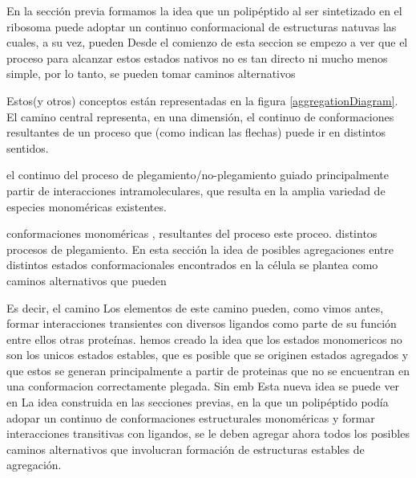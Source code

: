 % 



En la sección previa formamos la idea que un polipéptido al ser sintetizado en el ribosoma puede adoptar un continuo conformacional de estructuras natuvas las cuales, a su vez, pueden 
Desde el comienzo de esta seccion se empezo a ver que el proceso para alcanzar estos estados nativos no es tan directo ni mucho menos simple, por lo tanto, se pueden tomar caminos alternativos 

Estos(y otros) conceptos están representadas en la figura \ref{aggregationDiagram}.
El camino central representa, en una dimensión, el continuo de conformaciones resultantes de un proceso que (como indican las flechas) puede ir en distintos sentidos.

el continuo del proceso de plegamiento/no-plegamiento guiado principalmente partir de interacciones intramoleculares, que resulta en la amplia variedad de especies monoméricas existentes.


conformaciones monoméricas 
, resultantes del proceso  este proceo. 
distintos procesos de plegamiento. 
En esta sección    la idea de posibles agregaciones entre distintos estados conformacionales encontrados en la célula se plantea como caminos alternativos que pueden 

Es decir, el camino 
Los elementos de este camino pueden, como vimos antes, formar interacciones transientes con diversos ligandos como parte de su función entre ellos otras proteínas. 
hemos creado la idea que los estados monomericos no son los unicos estados estables, que es posible que se originen estados agregados y que estos se generan principalmente a partir de proteinas que no se encuentran en una conformacion correctamente plegada.
Sin emb
Esta nueva idea se puede ver en 
La idea construida en las secciones previas, en la que un polipéptido podía adopar un continuo de conformaciones estructurales monoméricas y formar interacciones transitivas con ligandos,
se le deben agregar ahora todos los posibles caminos alternativos que involucran formación de estructuras estables de agregación.

